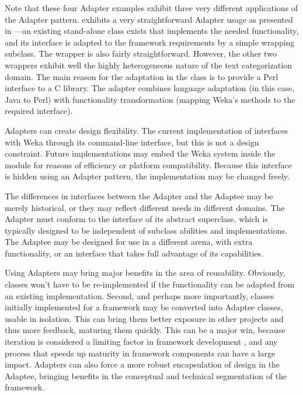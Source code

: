 Note that these four Adapter examples exhibit three very different
applications of the Adapter pattern.  
exhibits a very straightforward Adapter usage as presented in
\cite{gamma:95}---an existing stand-alone class exists that implements the
needed functionality, and its interface is adapted to the framework
requirements by a simple wrapping subclass.  The 
wrapper is also fairly straightforward.  However, the other two
wrappers exhibit well the highly heterogeneous nature of the text
categorization domain.  The main reason for the adaptation in the
 class is to provide a Perl interface to a C
library.  The  adapter combines language
adaptation (in this case, Java to Perl) with functionality
transformation (mapping Weka's methods to the required 
interface).

Adapters can create design flexibility.
The current implementation of  interfaces with
Weka through its command-line interface, but this is not a design
constraint.  Future implementations may embed the Weka system inside
the  module for reasons of efficiency or platform
compatibility.  Because this interface is hidden using an Adapter
pattern, the implementation may be changed freely.

The differences in interfaces between the Adapter and the Adaptee may
be merely historical, or they may reflect different needs in different
domains.  The Adapter must conform to the interface of its abstract
superclass, which is typically designed to be independent of subclass
abilities and implementations.  The Adaptee may be designed for use in
a different arena, with extra functionality, or an interface that
takes full advantage of its capabilities.

Using Adapters may bring major benefits in the area of reusability.
Obviously, classes won't have to be re-implemented if the
functionality can be adapted from an existing implementation.  Second,
and perhaps more importantly, classes initially implemented for a
framework may be converted into Adaptee classes, usable in isolation.
This can bring them better exposure in other projects and thus more
feedback, maturing them quickly.  This can be a major win, because
iteration is considered a limiting factor in framework development
\cite[p. 75]{fayad:99}, and any process that speeds up maturity in
framework components can have a large impact.  Adapters can also force
a more robust encapsulation of design in the Adaptee, bringing
benefits in the conceptual and technical segmentation of the
framework.

